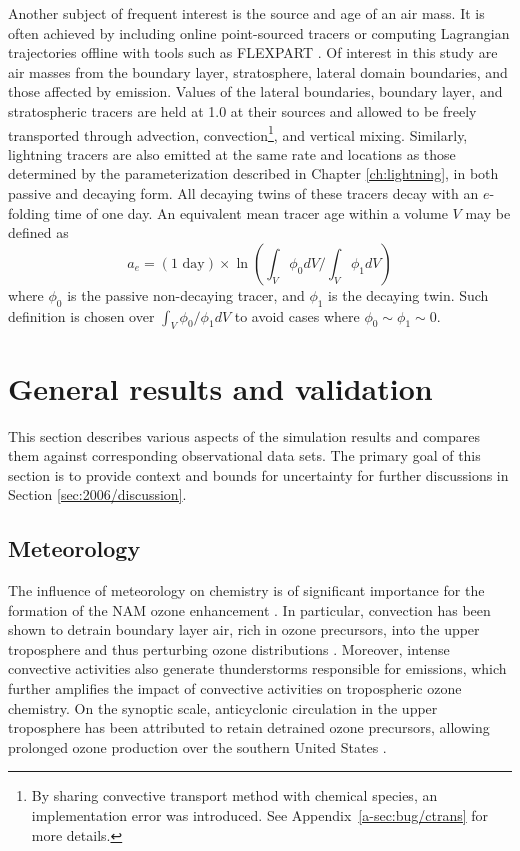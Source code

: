 	Another subject of frequent interest is the source and age of an air mass. It is often achieved by including online point-sourced tracers or computing Lagrangian trajectories offline with tools such as FLEXPART \citep{Stohl:2005vn}. Of interest in this study are air masses from the boundary layer, stratosphere, lateral domain boundaries, and those affected by {\lnox} emission. Values of the lateral boundaries, boundary layer, and stratospheric tracers are held at 1.0 at their sources and allowed to be freely transported through advection, convection\footnote{By sharing convective transport method with chemical species, an implementation error was introduced. See \mbox{Appendix}~\ref{a-sec:bug/ctrans} for more details.}, and vertical mixing. Similarly, lightning tracers are also emitted at the same rate and locations as those determined by the {\lnox} parameterization described in Chapter \ref{ch:lightning}, in both passive and decaying form. All decaying twins of these tracers decay with an $e$-folding time of one day. An equivalent mean tracer age within a volume $V$ may be defined as
	\begin{equation}\label{eqn:tracer-age}
		a_e = (\mbox {1 day})\times\ln\left(\int_V{\phi_0}dV/\int_V\phi_1dV\right)
	\end{equation}
	where $\phi_0$ is the passive non-decaying tracer, and $\phi_1$ is the decaying twin. Such definition is chosen over $\int_V\phi_0/\phi_1dV$ to avoid cases where $\phi_0\sim\phi_1\sim0$.

\section{General results and validation}\label{sec:2006/general}

This section describes various aspects of the simulation results and compares them against
corresponding observational data sets. The primary goal of this section is to provide context
and bounds for uncertainty for further discussions in Section \ref{sec:2006/discussion}.

\subsection{Meteorology}\label{ssec:2006/gen/met}

The influence of meteorology on chemistry is of significant importance for the formation of the NAM
ozone enhancement \citep{Li:2005ss,Cooper:2007cr,Barth:2012qf}. In particular, convection has
been shown to detrain boundary layer air, rich in ozone precursors, into the upper troposphere and
thus perturbing ozone distributions \citep{Dickerson:1987hc,Kar:2004jl,Weinstock:2007yj}. Moreover,
intense convective activities also generate thunderstorms responsible for {\lnox} emissions, which
further amplifies the impact of convective activities on tropospheric ozone chemistry. On the synoptic
scale, anticyclonic circulation in the upper troposphere has been attributed to retain detrained ozone
precursors, allowing prolonged ozone production over the southern United States
\citep{Li:2005ss,Cooper:2007cr}.


